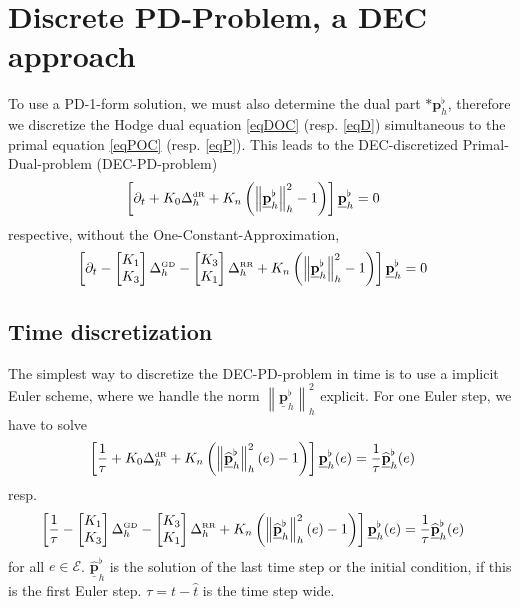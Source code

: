 \documentclass[a4paper,11pt]{scrartcl}
\newcommand{\pflh}{\mathbf{p}^{\flat}_{h}}
\newcommand{\PDpflh}{\underline{\mathbf{p}}^{\flat}_{h}}
\newcommand{\PDpflhOld}{\underline{\widehat{\mathbf{p}}}^{\flat}_{h}}
\newcommand{\LB}{\Delta^{\text{\tiny RR}}}
\newcommand{\LCB}{\Delta^{\text{\tiny GD}}}
\newcommand{\LDR}{\Delta^{\text{\tiny dR}}}
\newcommand{\LBh}{\LB_{h}}
\newcommand{\LCBh}{\LCB_{h}}
\newcommand{\LDRh}{\LDR_{h}}
\newcommand{\E}{\mathcal{E}}
\begin{document}
\section{Discrete PD-Problem, a DEC approach}
  To use a PD-1-form solution, we must also determine the dual part \( *\pflh \), 
  therefore we discretize the Hodge dual equation \eqref{eqDOC} (resp. \eqref{eqD}) simultaneous to the primal equation
  \eqref{eqPOC} (resp. \eqref{eqP}).
  This leads to the DEC-discretized Primal-Dual-problem (DEC-PD-problem) 
  \begin{align}
    \left[ \partial_{t} + K_{0}\LDRh + K_{n}\left( \left\| \PDpflh \right\|_{h}^{2} - 1 \right) \right]\PDpflh &= 0
  \end{align}
  respective, without the One-Constant-Approximation,  
  \begin{align}
    \left[ \partial_{t} -   
            \begin{bmatrix}
               K_{1} \\ K_{3}
            \end{bmatrix} \LCBh
            -\begin{bmatrix}
               K_{3} \\ K_{1}
            \end{bmatrix} \LBh
    + K_{n}\left( \left\| \PDpflh \right\|_{h}^{2} - 1 \right) \right]\PDpflh &= 0
  \end{align}

  \subsection{Time discretization}
    The simplest way to discretize the DEC-PD-problem in time is to use a implicit Euler scheme, 
    where we handle the norm \( \left\| \PDpflh \right\|_{h}^{2} \) explicit.
    For one Euler step, we have to solve
    \begin{align}
      \left[ \frac{1}{\tau} + K_{0}\LDRh + K_{n}\left( \left\| \PDpflhOld \right\|_{h}^{2}(e) - 1 \right) \right]\PDpflh(e) 
          &= \frac{1}{\tau} \PDpflhOld(e)
    \end{align}
    resp.
    \begin{align}
       \left[  \frac{1}{\tau}-   
            \begin{bmatrix}
               K_{1} \\ K_{3}
            \end{bmatrix} \LCBh
            -\begin{bmatrix}
               K_{3} \\ K_{1}
            \end{bmatrix} \LBh
    + K_{n}\left( \left\| \PDpflhOld \right\|_{h}^{2}(e) - 1 \right) \right]\PDpflh(e) 
          &= \frac{1}{\tau} \PDpflhOld(e)
    \end{align}
    for all \( e\in\E \).
    \( \PDpflhOld  \) is the solution of the last time step or the initial condition, if this is the first Euler step.
    \( \tau = t - \hat{t}  \) is the time step wide.
    
\end{document}
